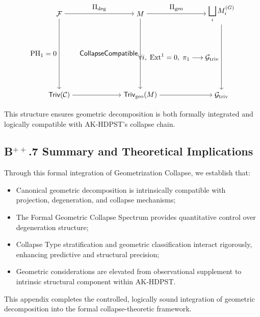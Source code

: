 \documentclass[11pt]{article}
\begin{document}
\[
\begin{tikzpicture}[node distance=4cm, auto]
  \node (F) {$\mathcal{F}$};
  \node (M) [right of=F] {$M$};
  \node (Mg) [right of=M] {$\displaystyle \bigsqcup_i M_i^{(G)}$};
  \node (TrivF) [below of=F] {$\mathsf{Triv}(\mathcal{C})$};
  \node (TrivM) [below of=M] {$\mathsf{Triv}_{\mathrm{geo}}(M)$};
  \node (Gtriv) [below of=Mg] {$\mathcal{G}_{\mathrm{triv}}$};

  \draw[->] (F) to node {$\Pi_{\mathrm{deg}}$} (M);
  \draw[->] (M) to node {$\Pi_{\mathrm{geo}}$} (Mg);

  \draw[->] (F) to node[left] {$\mathrm{PH}_1 = 0$} (TrivF);
  \draw[->] (M) to node[left] {$\mathsf{CollapseCompatible}$} (TrivM);
  \draw[->] (Mg) to node[left] {$\forall i,\; \mathrm{Ext}^1 = 0,\; \pi_1 \longrightarrow \mathcal{G}_{\mathrm{triv}}$} (Gtriv);

  \draw[->] (TrivF) to (TrivM);
  \draw[->] (TrivM) to (Gtriv);
\end{tikzpicture}
\]

This structure ensures geometric decomposition is both formally integrated and logically compatible with AK-HDPST's collapse chain.

\subsection*{B$^{++}$.7 Summary and Theoretical Implications}

Through this formal integration of Geometrization Collapse, we establish that:

\begin{itemize}
    \item Canonical geometric decomposition is intrinsically compatible with projection, degeneration, and collapse mechanisms;
    \item The Formal Geometric Collapse Spectrum provides quantitative control over degeneration structure;
    \item Collapse Type stratification and geometric classification interact rigorously, enhancing predictive and structural precision;
    \item Geometric considerations are elevated from observational supplement to intrinsic structural component within AK-HDPST.
\end{itemize}

This appendix completes the controlled, logically sound integration of geometric decomposition into the formal collapse-theoretic framework.
\end{document}
